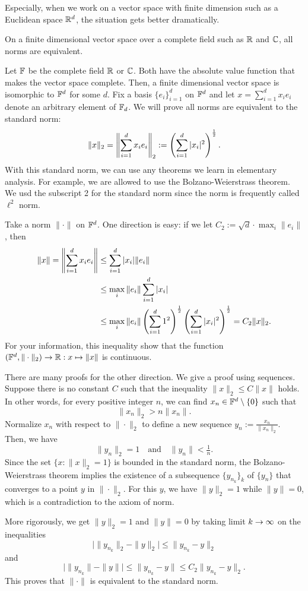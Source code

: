\documentclass{../crs}
\begin{document}
Especially, when we work on a vector space with finite dimension such as a Euclidean space $\mathbb{R}^d$, the situation gets better dramatically.

\begin{thm}\label{thm:equivalent norms on finite dimension}
On a finite dimensional vector space over a complete field such as $\mathbb{R}$ and $\mathbb{C}$, all norms are equivalent.
\end{thm}
\begin{pf}
Let $\mathbb{F}$ be the complete field $\mathbb{R}$ or $\mathbb{C}$.
Both have the absolute value function that makes the vector space complete.
Then, a finite dimensional vector space is isomorphic to $\mathbb{F}^d$ for some $d$.
Fix a basis $\{e_i\}_{i=1}^d$ on $\mathbb{F}^d$ and let $x=\sum_{i=1}^dx_ie_i$ denote an arbitrary element of $\mathbb{F}_d$.
We will prove all norms are equivalent to the standard norm:
\[\|x\|_2=\left\lVert\sum_{i=1}^dx_ie_i\right\rVert_2:=\left(\sum_{i=1}^d|x_i|^2\right)^{\frac12}.\]
With this standard norm, we can use any theorems we learn in elementary analysis.
For example, we are allowed to use the Bolzano-Weierstrass theorem.
We usd the subscript 2 for the standard norm since the norm is frequently called $\ell^2$ norm.


Take a norm $\|\cdot\|$ on $\mathbb{F}^d$.
One direction is easy: if we let $C_2:=\sqrt{d}\cdot\max_i\|e_i\|$, then
\begin{align*}
\|x\|=\left\lVert\sum_{i=1}^dx_ie_i\right\rVert&\le\sum_{i=1}^d|x_i|\|e_i\|\\
&\le\max_i\|e_i\|\sum_{i=1}^d|x_i|\\
&\le\max_i\|e_i\|\left(\sum_{i=1}^d1^2\right)^{\frac12}\left(\sum_{i=1}^d|x_i|^2\right)^{\frac12}=C_2\|x\|_2.
\end{align*}
For your information, this inequality show that the function $(\F^d,\|\cdot\|_2)\to\R:x\mapsto\|x\|$ is continuous.

There are many proofs for the other direction.
We give a proof using sequences.
Suppose there is no constant $C$ such that the inequality $\|x\|_2\le C\|x\|$ holds.
In other words, for every positive integer $n$, we can find $x_n\in\mathbb{F}^d\setminus\{0\}$ such that
\[\|x_n\|_2>n\|x_n\|.\]
Normalize $x_n$ with respect to $\|\cdot\|_2$ to define a new sequence $y_n:=\frac{x_n}{\|x_n\|_2}$.
Then, we have
\[\|y_n\|_2=1\quad\text{and}\quad\|y_n\|<\tfrac1n.\]
Since the set $\{x:\|x\|_2=1\}$ is bounded in the standard norm, the Bolzano-Weierstrass theorem implies the existence of a subsequence $\{y_{n_k}\}_k$ of $\{y_n\}$ that converges to a point $y$ in $\|\cdot\|_2$.
For this $y$, we have $\|y\|_2=1$ while $\|y\|=0$, which is a contradiction to the axiom of norm.

More rigorously, we get $\|y\|_2=1$ and $\|y\|=0$ by taking limit $k\to\oo$ on the inequalities
\[\bigl|\|y_{n_k}\|_2-\|y\|_2\bigr|\le\|y_{n_k}-y\|_2\]
and
\[\bigl|\|y_{n_k}\|-\|y\|\bigr|\le\|y_{n_k}-y\|\le C_2\|y_{n_k}-y\|_2.\]
This proves that $\|\cdot\|$ is equivalent to the standard norm.
\end{pf}
\end{document}
